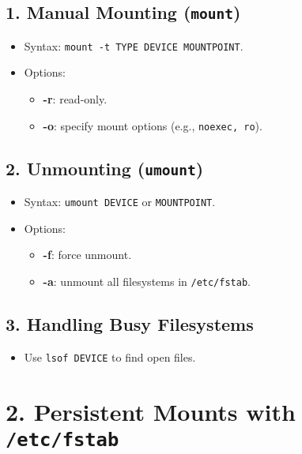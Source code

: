 \documentclass[a4paper]{report}
\begin{document}
\subsection*{1. Manual Mounting (\texttt{mount})}
\begin{itemize}
    \item Syntax: \texttt{mount -t TYPE DEVICE MOUNTPOINT}.
    \item Options:
    \begin{itemize}
        \item \textbf{-r}: read-only.
        \item \textbf{-o}: specify mount options (e.g., \texttt{noexec, ro}).
    \end{itemize}
\end{itemize}

\subsection*{2. Unmounting (\texttt{umount})}
\begin{itemize}
    \item Syntax: \texttt{umount DEVICE} or \texttt{MOUNTPOINT}.
    \item Options:
    \begin{itemize}
        \item \textbf{-f}: force unmount.
        \item \textbf{-a}: unmount all filesystems in \texttt{/etc/fstab}.
    \end{itemize}
\end{itemize}

\subsection*{3. Handling Busy Filesystems}
\begin{itemize}
    \item Use \texttt{lsof DEVICE} to find open files.
\end{itemize}

\section*{2. Persistent Mounts with \texttt{/etc/fstab}}
\end{document}
